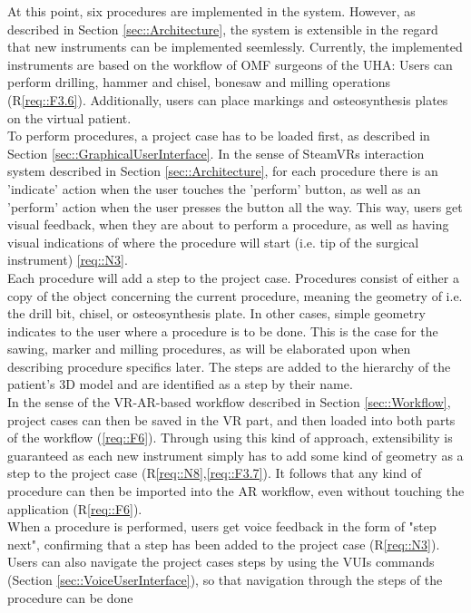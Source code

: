 At this point, six procedures are implemented in the system.
However, as described in Section \ref{sec::Architecture}, the system is extensible in the regard that new instruments can be implemented seemlessly.
Currently, the implemented instruments are based on the workflow of OMF surgeons of the UHA: Users can perform drilling, hammer and chisel, bonesaw and milling operations (R\ref{req::F3.6}).
Additionally, users can place markings and osteosynthesis plates on the virtual patient.
\\ To perform procedures, a project case has to be loaded first, as described in Section \ref{sec::GraphicalUserInterface}.
In the sense of SteamVRs interaction system described in Section \ref{sec::Architecture}, for each procedure there is an 'indicate' action when the user touches the 
'perform' button, as well as an 'perform' action when the user presses the button all the way.
This way, users get visual feedback, when they are about to perform a procedure, as well as having visual indications of where the procedure will start (i.e. tip of the surgical instrument) \ref{req::N3}.
\\ Each procedure will add a step to the project case.
Procedures consist of either a copy of the object concerning the current procedure, meaning the geometry of i.e. the drill bit, chisel, or osteosynthesis plate.
In other cases, simple geometry indicates to the user where a procedure is to be done. This is the case for the sawing, marker and milling procedures, as will be elaborated upon 
when describing procedure specifics later.
The steps are added to the hierarchy of the patient's 3D model and are identified as a step by their name.
\\ In the sense of the VR-AR-based workflow described in Section \ref{sec::Workflow}, project cases can then be saved in the VR part, and then loaded into both parts of the workflow (\ref{req::F6}).
Through using this kind of approach, extensibility is guaranteed as each new instrument simply has to add some kind of geometry as a step to the project case (R\ref{req::N8},\ref{req::F3.7}).
It follows that any kind of procedure can then be imported into the AR workflow, even without touching the application (R\ref{req::F6}).
\\ When a procedure is performed, users get voice feedback in the form of "step next", confirming that a step has been added to the project case (R\ref{req::N3}).
Users can also navigate the project cases steps by using the VUIs commands (Section \ref{sec::VoiceUserInterface}), so that navigation through the steps of the procedure can be done 
